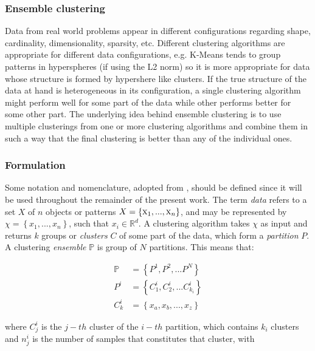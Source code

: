 \subsubsection{Ensemble clustering}
Data from real world problems appear in different configurations regarding shape, cardinality, dimensionality, sparsity, etc. 
Different clustering algorithms are appropriate for different data configurations, e.g. K-Means tends to group patterns in hyperspheres (if using the L2 norm) \cite{Jain1999} so it is more appropriate for data whose structure is formed by hypershere like clusters.
If the true structure of the data at hand is heterogeneous in its configuration, a single clustering algorithm might perform well for some part of the data while other performs better for some other part.
The underlying idea behind ensemble clustering is to use multiple clusterings from one or more clustering algorithms and combine them in such a way that the final clustering is better than any of the individual ones.

\subsubsection{Formulation}
Some notation and nomenclature, adopted from \cite{Fred2005}, should be defined since it will be used throughout the remainder of the present work.
The term \emph{data} refers to a set $X$ of $n$ objects or patterns $X=\left \{ \textsc{x}_1,...,\textsc{x}_n \right \}$, and may be represented by $\chi = \left \{ x_1,...,x_n \right \}$, such that $x_i \in  \mathbb{R}^d$.
A clustering algorithm takes $\chi$ as input and returns $k$ groups or \emph{clusters} $C$ of some part of the data, which form a \emph{partition} $P$.
A clustering \emph{ensemble} $\mathbb{P}$ is group of $N$ partitions.
This means that:

\begin{align}
	\mathbb{P} &= \left \{   P^1, P^2, ... P^N   \right \}  \label{eq:ensemble} \\
	P^i &= \left \{   C^i_1, C^i_2, ... C^{i}_{k_i}   \right \}  \label{eq:partition} \\
	C^i_k &= \left \{   x_a, x_b, ..., x_z   \right \} \label{eq:cluster}
\end{align}

where $C^i_j$ is the $j-th$ cluster of the $i-th$ partition, which contains $k_i$ clusters and $n^i_j$ is the number of samples that constitutes that cluster, with

